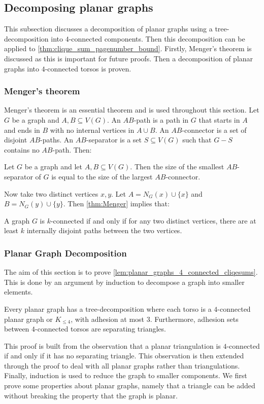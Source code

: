 \subsection{Decomposing planar graphs}
This subsection discusses a decomposition of planar graphs using a tree-decomposition into $4$-connected components. Then this decomposition can be applied to \cref{thm:clique_sum_pagenumber_bound}. Firstly, Menger's theorem is discussed as this is important for future proofs. Then a decomposition of planar graphs into $4$-connected torsos is proven.

\subsubsection{Menger's theorem}

Menger's theorem \cite{mengerZurAllgemeinenKurventheorie1927} is an essential theorem and is used throughout this section. 
Let \(G\) be a graph and \(A, B \subseteq V(G)\). An \(AB\)-path is a path in \(G\) that starts in \(A\) and ends in \(B\) with no internal vertices in \(A \cup B\). An \(AB\)-connector is a set of disjoint \(AB\)-paths. An \(AB\)-separator is a set \(S \subseteq V(G)\) such that \(G - S\) contains no \(AB\)-path. Then:
\begin{theorem}\label{thm:Menger}
	Let $G$ be a graph and let $A, B \subseteq V(G)$. Then the size of the smallest \(AB\)-separator of \(G\) is equal to the size of the largest \(AB\)-connector.
\end{theorem}
Now take two distinct vertices \(x, y\). Let \(A = N_G(x) \cup \{x\} \) and \(B = N_G(y) \cup \{y\} \). Then \cref{thm:Menger} implies that:
\begin{theorem}\label{thm:Menger_Vertex}
	A graph \(G\) is \(k\)-connected if and only if for any two distinct vertices, there are at least \(k\) internally disjoint paths between the two vertices.
\end{theorem}

\subsubsection{Planar Graph Decomposition}
The aim of this section is to prove \cref{lem:planar_graphs_4_connected_cliqesums}. This is done by an argument by induction to decompose a graph into smaller elements. 
\begin{proposition}\label{lem:planar_graphs_4_connected_cliqesums}
	Every planar graph has a tree-decomposition where each torso is a \(4\)-connected planar graph or $K_{\leq 4}$, with adhesion at most \(3\). Furthermore, adhesion sets between $4$-connected torsos are separating triangles.
\end{proposition}
This proof is built from the observation that a planar triangulation is $4$-connected if and only if it has no separating triangle. This observation is then extended through the proof to deal with all planar graphs rather than triangulations. Finally, induction is used to reduce the graph to smaller components. We first prove some properties about planar graphs, namely that a triangle can be added without breaking the property that the graph is planar.

